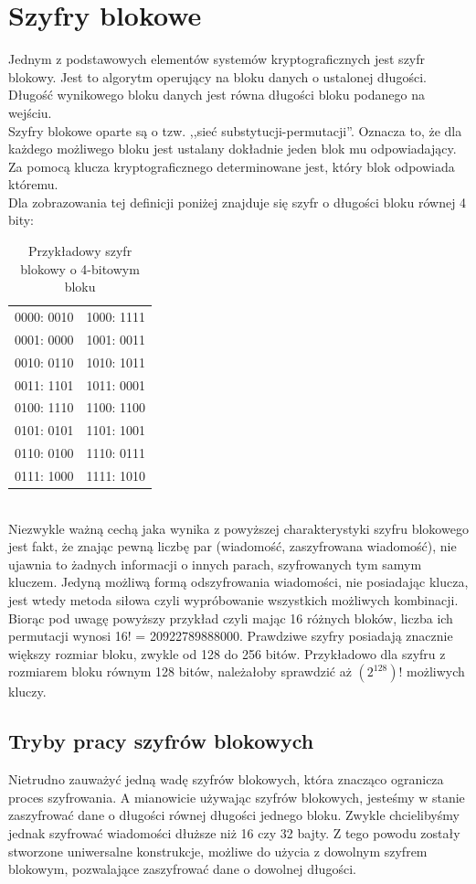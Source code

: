\section{Szyfry blokowe}
Jednym z podstawowych elementów systemów kryptograficznych jest szyfr blokowy. Jest to algorytm operujący na bloku danych o ustalonej długości. Długość wynikowego bloku danych jest równa długości bloku podanego na wejściu. \\
Szyfry blokowe oparte są o tzw. ,,sieć substytucji-permutacji''. 
Oznacza to, że dla każdego możliwego bloku jest ustalany dokładnie jeden blok mu odpowiadający. Za pomocą klucza kryptograficznego determinowane jest, który blok odpowiada któremu. \\
Dla zobrazowania tej definicji poniżej znajduje się szyfr o długości bloku równej 4 bity:
\begin{table}[h!]
\centering
\caption{Przykładowy szyfr blokowy o 4-bitowym bloku}
\begin{tabular}{ |c|c| } 
 \hline
	0000: 0010 & 1000: 1111 \\
	0001: 0000 & 1001: 0011 \\
	0010: 0110 & 1010: 1011 \\
	0011: 1101 & 1011: 0001 \\
	0100: 1110 & 1100: 1100 \\
	0101: 0101 & 1101: 1001 \\
	0110: 0100 & 1110: 0111 \\
	0111: 1000 & 1111: 1010 \\
 \hline
\end{tabular}
\end{table} \\
Niezwykle ważną cechą jaka wynika z powyższej charakterystyki szyfru blokowego jest fakt, że znając pewną liczbę par (wiadomość, zaszyfrowana wiadomość), nie ujawnia to żadnych informacji o innych parach, szyfrowanych tym samym kluczem.
Jedyną możliwą formą odszyfrowania wiadomości, nie posiadając klucza, jest wtedy metoda siłowa czyli wypróbowanie wszystkich możliwych kombinacji. 
Biorąc pod uwagę powyższy przykład czyli mając 16 różnych bloków, liczba ich permutacji wynosi 16! = 20922789888000. 
Prawdziwe szyfry posiadają znacznie większy rozmiar bloku, zwykle od 128 do 256 bitów. Przykładowo dla szyfru z rozmiarem bloku równym 128 bitów, należałoby sprawdzić aż $(2^{128})!$ możliwych kluczy.

\subsection{Tryby pracy szyfrów blokowych}
Nietrudno zauważyć jedną wadę szyfrów blokowych, która znacząco ogranicza proces szyfrowania. 
A mianowicie używając szyfrów blokowych, jesteśmy w stanie zaszyfrować dane o długości równej długości jednego bloku. 
Zwykle chcielibyśmy jednak szyfrować wiadomości dłuższe niż 16 czy 32 bajty. 
Z tego powodu zostały stworzone uniwersalne konstrukcje, możliwe do użycia z dowolnym szyfrem blokowym, 
pozwalające zaszyfrować dane o dowolnej długości.

